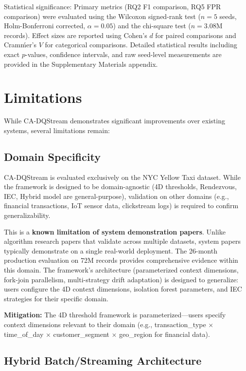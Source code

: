 Statistical significance: Primary metrics (RQ2 F1 comparison, RQ5 FPR comparison) were evaluated using the Wilcoxon signed-rank test ($n=5$ seeds, Holm-Bonferroni corrected, $\alpha=0.05$) and the chi-square test ($n=3.08$M records). Effect sizes are reported using Cohen's $d$ for paired comparisons and Cram\'mer's $V$ for categorical comparisons. Detailed statistical results including exact $p$-values, confidence intervals, and raw seed-level measurements are provided in the Supplementary Materials appendix.

\section{Limitations}

While CA-DQStream demonstrates significant improvements over existing systems, several limitations remain:

\subsection{Domain Specificity}

CA-DQStream is evaluated exclusively on the NYC Yellow Taxi dataset. While the framework is designed to be domain-agnostic (4D thresholds, Rendezvous, IEC, Hybrid model are general-purpose), validation on other domains (e.g., financial transactions, IoT sensor data, clickstream logs) is required to confirm generalizability.

This is a \textbf{known limitation of system demonstration papers}. Unlike algorithm research papers that validate across multiple datasets, system papers typically demonstrate on a single real-world deployment. The 26-month production evaluation on 72M records provides comprehensive evidence within this domain. The framework's architecture (parameterized context dimensions, fork-join parallelism, multi-strategy drift adaptation) is designed to generalize: users configure the 4D context dimensions, isolation forest parameters, and IEC strategies for their specific domain.

\textbf{Mitigation:} The 4D threshold framework is parameterized---users specify context dimensions relevant to their domain (e.g., transaction\_type $\times$ time\_of\_day $\times$ customer\_segment $\times$ geo\_region for financial data).

\subsection{Hybrid Batch/Streaming Architecture}

